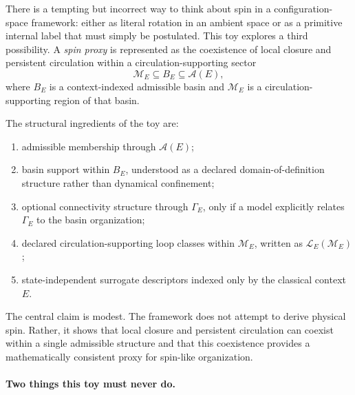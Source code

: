 \documentclass[aps,prx,onecolumn,11pt]{revtex4-2}
\theoremstyle{plain}
\theoremstyle{definition}
\theoremstyle{remark}
\begin{document}
There is a tempting but incorrect way to think about spin in a
configuration-space framework: either as literal rotation in an ambient
space or as a primitive internal label that must simply be postulated.
This toy explores a third possibility. A \emph{spin proxy} is
represented as the coexistence of local closure and persistent
circulation within a circulation-supporting sector
\[
\mathcal M_E
\subseteq
B_E
\subseteq
\mathcal A(E),
\]
where \(B_E\) is a context-indexed admissible basin and
\(\mathcal M_E\) is a circulation-supporting region of that basin.

The structural ingredients of the toy are:

\begin{enumerate}[label=(\alph*), leftmargin=2.2em]

\item admissible membership through \(\mathcal A(E)\);

\item basin support within \(B_E\), understood as a declared
domain-of-definition structure rather than dynamical confinement;

\item optional connectivity structure through \(\Gamma_E\), only if a
model explicitly relates \(\Gamma_E\) to the basin organization;

\item declared circulation-supporting loop classes within
\(\mathcal M_E\), written as \(\mathcal L_E(\mathcal M_E)\);

\item state-independent surrogate descriptors indexed only by the
classical context \(E\).

\end{enumerate}

The central claim is modest. The framework does not attempt to derive
physical spin. Rather, it shows that local closure and persistent
circulation can coexist within a single admissible structure and that
this coexistence provides a mathematically consistent proxy for
spin-like organization.

\paragraph{Two things this toy must never do.}
\end{document}
